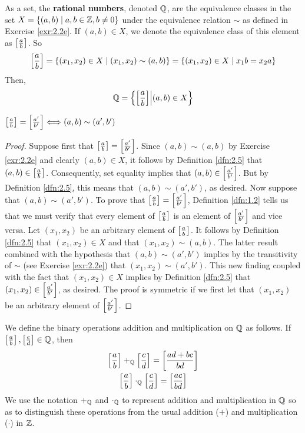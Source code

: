 \documentclass[../main.tex]{subfiles}
\begin{document}
\begin{definition}\label{dfn:2.5}
    As a set, the \textbf{rational numbers}, denoted $\mathbb{Q}$, are the equivalence classes in the set $X=\{(a,b)\mid a,b\in\mathbb{Z},b\neq 0\}$ under the equivalence relation $\sim$ as defined in Exercise \ref{exr:2.2e}. If $(a,b)\in X$, we denote the equivalence class of this element as $\left[ \frac{a}{b} \right]$. So
    \begin{equation*}
        \left[ \frac{a}{b} \right] = \{(x_1,x_2)\in X\mid(x_1,x_2)\sim(a,b)\}
        = \{(x_1,x_2)\in X\mid x_1b=x_2a\}
    \end{equation*}
    Then,
    \begin{equation*}
        \mathbb{Q} = \left\{\left[ \frac{a}{b} \right]\middle|(a,b)\in X\right\}
    \end{equation*}
\end{definition}

\begin{exercise}\label{exr:2.6}
    $\left[ \frac{a}{b} \right]=\left[ \frac{a'}{b'} \right]\Longleftrightarrow(a,b)\sim(a',b')$
    \begin{proof}
        Suppose first that $\left[ \frac{a}{b} \right]=\left[ \frac{a'}{b'} \right]$. Since $(a,b)\sim(a,b)$ by Exercise \ref{exr:2.2e} and clearly $(a,b)\in X$, it follows by Definition \ref{dfn:2.5} that $(a,b)\in\left[ \frac{a}{b} \right]$. Consequently, set equality implies that $(a,b)\in\left[ \frac{a'}{b'} \right]$. But by Definition \ref{dfn:2.5}, this means that $(a,b)\sim(a',b')$, as desired. Now suppose that $(a,b)\sim(a',b')$. To prove that $\left[ \frac{a}{b} \right]=\left[ \frac{a'}{b'} \right]$, Definition \ref{dfn:1.2} tells us that we must verify that every element of $\left[ \frac{a}{b} \right]$ is an element of $\left[ \frac{a'}{b'} \right]$ and vice versa. Let $(x_1,x_2)$ be an arbitrary element of $\left[ \frac{a}{b} \right]$. It follows by Definition \ref{dfn:2.5} that $(x_1,x_2)\in X$ and that $(x_1,x_2)\sim(a,b)$. The latter result combined with the hypothesis that $(a,b)\sim(a',b')$ implies by the transitivity of $\sim$ (see Exercise \ref{exr:2.2e}) that $(x_1,x_2)\sim(a',b')$. This new finding coupled with the fact that $(x_1,x_2)\in X$ implies by Definition \ref{dfn:2.5} that $(x_1,x_2)\in\left[ \frac{a'}{b'} \right]$, as desired. The proof is symmetric if we first let that $(x_1,x_2)$ be an arbitrary element of $\left[ \frac{a'}{b'} \right]$.
    \end{proof}
\end{exercise}

\begin{definition}\label{dfn:2.7}
    We define the binary operations addition and multiplication on $\mathbb{Q}$ as follows. If $\left[ \frac{a}{b} \right],\left[ \frac{c}{d} \right]\in\mathbb{Q}$, then
    \begin{gather*}
        \left[ \frac{a}{b} \right]+_{\mathbb{Q}}\left[ \frac{c}{d} \right] = \left[ \frac{ad+bc}{bd} \right]\\
        \left[ \frac{a}{b} \right]\cdot_{\mathbb{Q}}\left[ \frac{c}{d} \right] = \left[ \frac{ac}{bd} \right]
    \end{gather*}
    We use the notation $+_{\mathbb{Q}}$ and $\cdot_{\mathbb{Q}}$ to represent addition and multiplication in $\mathbb{Q}$ so as to distinguish these operations from the usual addition ($+$) and multiplication ($\cdot$) in $\mathbb{Z}$.
\end{definition}
\end{document}
